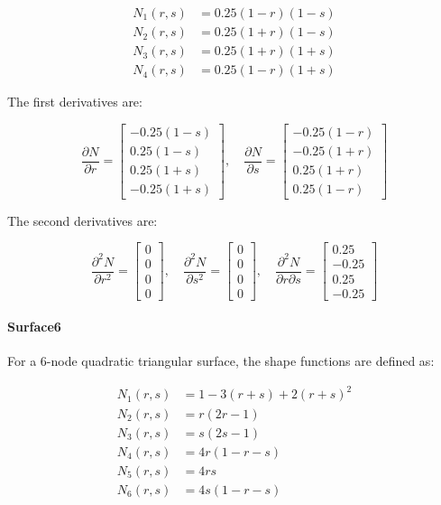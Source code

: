 \[
\begin{aligned}
N_1(r, s) &= 0.25 (1 - r)(1 - s) \\
N_2(r, s) &= 0.25 (1 + r)(1 - s) \\
N_3(r, s) &= 0.25 (1 + r)(1 + s) \\
N_4(r, s) &= 0.25 (1 - r)(1 + s)
\end{aligned}
\]

The first derivatives are:

\[
\frac{\partial N}{\partial r} =
\begin{bmatrix}
-0.25 (1 - s) \\
0.25 (1 - s) \\
0.25 (1 + s) \\
-0.25 (1 + s)
\end{bmatrix}, \quad
\frac{\partial N}{\partial s} =
\begin{bmatrix}
-0.25 (1 - r) \\
-0.25 (1 + r) \\
0.25 (1 + r) \\
0.25 (1 - r)
\end{bmatrix}
\]

The second derivatives are:

\[
\frac{\partial^2 N}{\partial r^2} =
\begin{bmatrix}
0 \\
0 \\
0 \\
0
\end{bmatrix}, \quad
\frac{\partial^2 N}{\partial s^2} =
\begin{bmatrix}
0 \\
0 \\
0 \\
0
\end{bmatrix}, \quad
\frac{\partial^2 N}{\partial r \partial s} =
\begin{bmatrix}
0.25 \\
-0.25 \\
0.25 \\
-0.25
\end{bmatrix}
\]
\paragraph{Surface6} For a 6-node quadratic triangular surface, the shape functions are defined as:

\[
\begin{aligned}
N_1(r, s) &= 1 - 3(r + s) + 2(r + s)^2 \\
N_2(r, s) &= r(2r - 1) \\
N_3(r, s) &= s(2s - 1) \\
N_4(r, s) &= 4r(1 - r - s) \\
N_5(r, s) &= 4rs \\
N_6(r, s) &= 4s(1 - r - s)
\end{aligned}
\]

